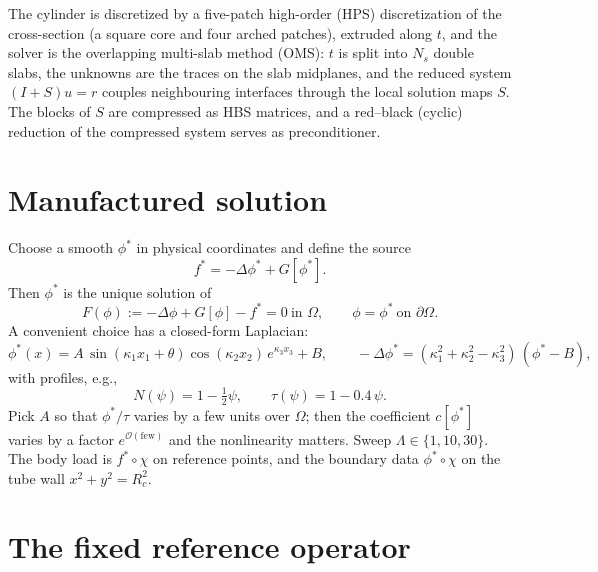 \documentclass[11pt,a4paper]{article}
\theoremstyle{remark}\newtheorem{remark}{Remark}
\begin{document}
The cylinder is discretized by a five-patch high-order (HPS) discretization of
the cross-section (a square core and four arched patches), extruded along $t$,
and the solver is the overlapping multi-slab method (OMS): $t$ is split into
$N_s$ double slabs, the unknowns are the traces on the slab midplanes, and the
reduced system $(I+S)u=r$ couples neighbouring interfaces through the local
solution maps $S$. The blocks of $S$ are compressed as HBS matrices, and a
red--black (cyclic) reduction of the compressed system serves as preconditioner.

\section{Manufactured solution}
Choose a smooth $\phi^*$ in physical coordinates and define the source
\begin{equation}
  f^*= -\Delta\phi^*+G[\phi^*].
\end{equation}
Then $\phi^*$ is the unique solution of
\begin{equation}\label{eq:mms}
  F(\phi):=-\Delta\phi+G[\phi]-f^*=0\ \text{in }\Omega,\qquad \phi=\phi^*\ \text{on }\partial\Omega .
\end{equation}
A convenient choice has a closed-form Laplacian:
\begin{equation}
  \phi^*(x)=A\,\sin(\kappa_1x_1+\theta)\cos(\kappa_2x_2)\,e^{\kappa_3x_3}+B,
  \qquad -\Delta\phi^*=(\kappa_1^2+\kappa_2^2-\kappa_3^2)\,(\phi^*-B),
\end{equation}
with profiles, e.g.,
\begin{equation}
  N(\psi)=1-\tfrac12\psi,\qquad \tau(\psi)=1-0.4\,\psi .
\end{equation}
Pick $A$ so that $\phi^*/\tau$ varies by a few units over $\Omega$; then
the coefficient $c[\phi^*]$ varies by a factor $e^{\mathcal O(\text{few})}$ and the nonlinearity matters.
Sweep $\Lambda\in\{1,10,30\}$. The body load is $f^*\circ\chi$ on reference
points, and the boundary data $\phi^*\circ\chi$ on the tube wall $x^2+y^2=R_c^2$.

\section{The fixed reference operator}
\end{document}
